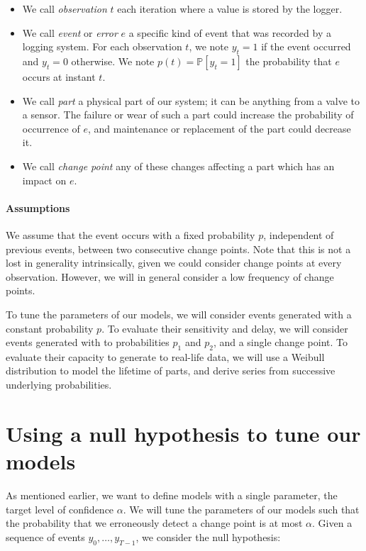 \documentclass{kththesis}
\def\P{{\mathbb{P}}}
\begin{document}
\begin{itemize}
\item We call \emph{observation} $t$ each iteration where a value is stored by the logger.

\item We call \emph{event} or \emph{error} $e$ a specific kind of event that was recorded by a logging system. For each observation $t$, we note $y_t=1$ if the event occurred and $y_t=0$ otherwise. We note $p(t)=\P[y_t=1]$ the probability that $e$ occurs at instant $t$.

\item We call \emph{part} a physical part of our system; it can be anything from a valve to a sensor. The failure or wear of such a part could increase the probability of occurrence of $e$, and maintenance or replacement of the part could decrease it.

\item We call \emph{change point} any of these changes affecting a part which has an impact on $e$.
\end{itemize}

\paragraph{Assumptions}

We assume that the event occurs with a fixed probability $p$, independent of previous events, between two consecutive change points. 
Note that this is not a lost in generality intrinsically, given we could consider change points at every observation. However, we will in general consider a low frequency of change points.

To tune the parameters of our models, we will consider events generated with a constant probability $p$. 
To evaluate their sensitivity and delay, we will consider events generated with to probabilities $p_1$ and $p_2$, and a single change point.
To evaluate their capacity to generate to real-life data, we will use a Weibull distribution to model the lifetime of parts, and derive series from successive underlying probabilities.

\section{Using a null hypothesis to tune our models}

As mentioned earlier, we want to define models with a single parameter, the target level of confidence $\alpha$. We will tune the parameters of our models such that the probability that we erroneously detect a change point is at most $\alpha$. 
Given a sequence of events $y_0, \ldots, y_{T-1}$, we consider the null hypothesis:\\
\end{document}
